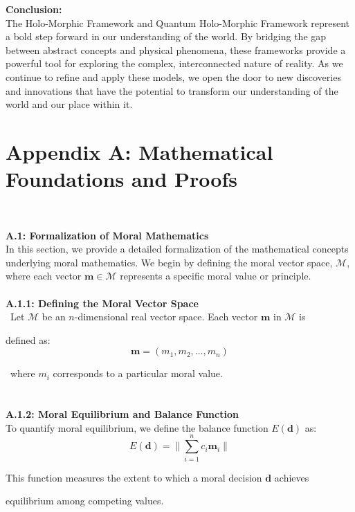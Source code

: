 \documentclass{article}
\begin{document}
\textbf{Conclusion:}
\\

The Holo-Morphic Framework and Quantum Holo-Morphic Framework represent a bold step forward in our understanding of the world. By bridging the gap between abstract concepts and physical phenomena, these frameworks provide a powerful tool for exploring the complex, interconnected nature of reality. As we continue to refine and apply these models, we open the door to new discoveries and innovations that have the potential to transform our understanding of the world and our place within it.

\section*{Appendix A: Mathematical Foundations and Proofs}
\

\textbf{A.1: Formalization of Moral Mathematics}
\\

In this section, we provide a detailed formalization of the mathematical concepts underlying moral mathematics. We begin by defining the moral vector space, \( \mathcal{M} \), where each vector \( \mathbf{m} \in \mathcal{M} \) represents a specific moral value or principle.
\\
\\

\textbf{A.1.1: Defining the Moral Vector Space}
\\

\
Let \( \mathcal{M} \) be an \( n \)-dimensional real vector space. Each vector \( \mathbf{m} \) in \( \mathcal{M} \) is 
\

defined as:
\[
\mathbf{m} = (m_1, m_2, \dots, m_n)
\]

\
where \( m_i \) corresponds to a particular moral value.
\\
\\
\\

\textbf{A.1.2: Moral Equilibrium and Balance Function}
\\

To quantify moral equilibrium, we define the balance function \( E(\mathbf{d}) \) as:
\[
E(\mathbf{d}) = \lVert \sum_{i=1}^{n} c_i \mathbf{m}_i \rVert
\]

This function measures the extent to which a moral decision \( \mathbf{d} \) achieves 
\

equilibrium among competing values.
\\
\\
\\
\end{document}
